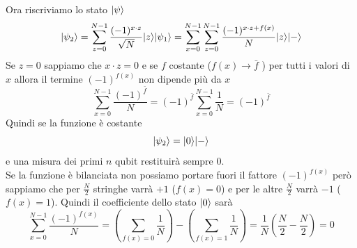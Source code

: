 \documentclass[12pt, a4paper]{report}
\begin{document}
Ora riscriviamo lo stato $| \psi \rangle$
\begin{equation*}
    | \psi_{2} \rangle = \sum_{z=0}^{N-1}\frac{(-1)^{x\cdot z}}{\sqrt{N}}| z \rangle| \psi_{1} \rangle = \sum_{x=0}^{N-1}\sum_{z=0}^{N-1} \frac{(-1)^{x\cdot z + f(x)}}{N}| z \rangle| - \rangle
\end{equation*}
Se $z=0$ sappiamo che $x\cdot z = 0$ e se $f$ costante ($f(x)\rightarrow \bar{f}$ ) per tutti i valori di $x$ allora il termine $(-1)^{f(x)}$ non dipende più da $x$
\begin{equation*}
    \sum_{x=0}^{N-1} \frac{(-1)^{\bar{f}}}{N} = (-1)^{\bar{f}}\sum_{x=0}^{N-1} \frac{1}{N} = (-1)^{\bar{f}}
\end{equation*}
Quindi se la funzione è costante
\begin{equation*}
    | \psi_{2} \rangle = | 0 \rangle| - \rangle
\end{equation*}
e una misura dei primi $n$ qubit restituirà sempre 0.\\
Se la funzione è bilanciata non possiamo portare fuori il fattore $(-1)^{f(x)}$ però sappiamo che per $\frac{N}{2}$ stringhe varrà $+1$ ($f(x)=0$) e per le altre $\frac{N}{2}$ varrà $-1$ ($f(x)=1$). Quindi il coefficiente dello stato $| 0 \rangle$ sarà
\begin{equation*}
    \sum_{x=0}^{N-1} \frac{(-1)^{f(x)}}{N} = \left(\sum_{f(x)=0}\frac{1}{N}\right)-\left(\sum_{f(x)=1}\frac{1}{N}\right) = \frac{1}{N}\left(\frac{N}{2}-\frac{N}{2}\right) = 0
\end{equation*}
\end{document}
